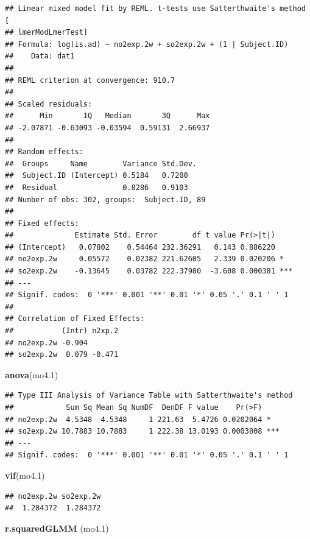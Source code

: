 \documentclass[12pt,]{article}
\newenvironment{Shaded}{\begin{snugshade}}{\end{snugshade}}
\newcommand{\FloatTok}[1]{\textcolor[rgb]{0.00,0.00,0.81}{#1}}
\newcommand{\KeywordTok}[1]{\textcolor[rgb]{0.13,0.29,0.53}{\textbf{#1}}}
\newcommand{\NormalTok}[1]{#1}
\begin{document}
\begin{verbatim}
## Linear mixed model fit by REML. t-tests use Satterthwaite's method [
## lmerModLmerTest]
## Formula: log(is.ad) ~ no2exp.2w + so2exp.2w + (1 | Subject.ID)
##    Data: dat1
## 
## REML criterion at convergence: 910.7
## 
## Scaled residuals: 
##      Min       1Q   Median       3Q      Max 
## -2.07871 -0.63093 -0.03594  0.59131  2.66937 
## 
## Random effects:
##  Groups     Name        Variance Std.Dev.
##  Subject.ID (Intercept) 0.5184   0.7200  
##  Residual               0.8286   0.9103  
## Number of obs: 302, groups:  Subject.ID, 89
## 
## Fixed effects:
##              Estimate Std. Error        df t value Pr(>|t|)    
## (Intercept)   0.07802    0.54464 232.36291   0.143 0.886220    
## no2exp.2w     0.05572    0.02382 221.62605   2.339 0.020206 *  
## so2exp.2w    -0.13645    0.03782 222.37980  -3.608 0.000381 ***
## ---
## Signif. codes:  0 '***' 0.001 '**' 0.01 '*' 0.05 '.' 0.1 ' ' 1
## 
## Correlation of Fixed Effects:
##           (Intr) n2xp.2
## no2exp.2w -0.904       
## so2exp.2w  0.079 -0.471
\end{verbatim}

\begin{Shaded}
\begin{Highlighting}[]
\KeywordTok{anova}\NormalTok{(mo4}\FloatTok{.1}\NormalTok{)}
\end{Highlighting}
\end{Shaded}

\begin{verbatim}
## Type III Analysis of Variance Table with Satterthwaite's method
##            Sum Sq Mean Sq NumDF  DenDF F value    Pr(>F)    
## no2exp.2w  4.5348  4.5348     1 221.63  5.4726 0.0202064 *  
## so2exp.2w 10.7883 10.7883     1 222.38 13.0193 0.0003808 ***
## ---
## Signif. codes:  0 '***' 0.001 '**' 0.01 '*' 0.05 '.' 0.1 ' ' 1
\end{verbatim}

\begin{Shaded}
\begin{Highlighting}[]
\KeywordTok{vif}\NormalTok{(mo4}\FloatTok{.1}\NormalTok{)}
\end{Highlighting}
\end{Shaded}

\begin{verbatim}
## no2exp.2w so2exp.2w 
##  1.284372  1.284372
\end{verbatim}

\begin{Shaded}
\begin{Highlighting}[]
\KeywordTok{r.squaredGLMM}\NormalTok{ (mo4}\FloatTok{.1}\NormalTok{)}
\end{Highlighting}
\end{Shaded}
\end{document}
